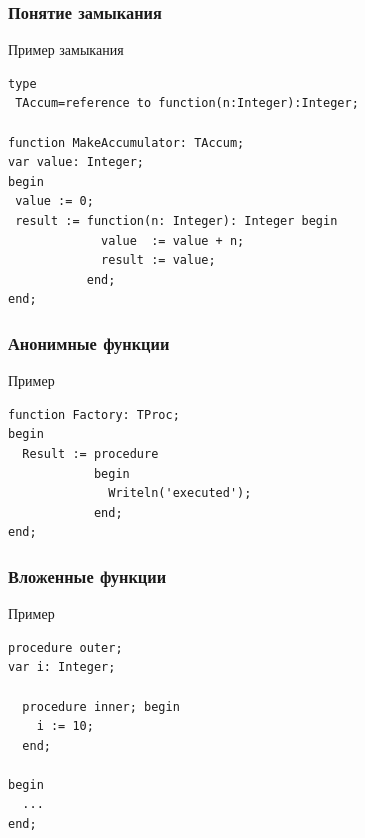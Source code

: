 \documentclass[roman,12pt]{beamer}
\begin{document}
\begin{frame}[fragile]
  \frametitle{Понятие замыкания}
  

\begin{block}{Пример замыкания}

\begin{lstlisting}
type
 TAccum=reference to function(n:Integer):Integer;

function MakeAccumulator: TAccum;
var value: Integer;
begin
 value := 0;
 result := function(n: Integer): Integer begin
             value  := value + n;
             result := value;
           end;
end;
\end{lstlisting}


\end{block}

  
\end{frame}

\begin{frame}[fragile]
  \frametitle{Анонимные функции}
  \begin{block}{Пример}
\begin{lstlisting}
function Factory: TProc;
begin
  Result := procedure
            begin
              Writeln('executed');
            end;
end;
\end{lstlisting}

  \end{block} 
\end{frame}

\begin{frame}[fragile]
  \frametitle{Вложенные функции}
  
  \begin{block}{Пример}
\begin{lstlisting}    
procedure outer;
var i: Integer;

  procedure inner; begin
    i := 10;
  end;

begin
  ...
end;    
\end{lstlisting}
  \end{block} 

\end{frame}
\end{document}
